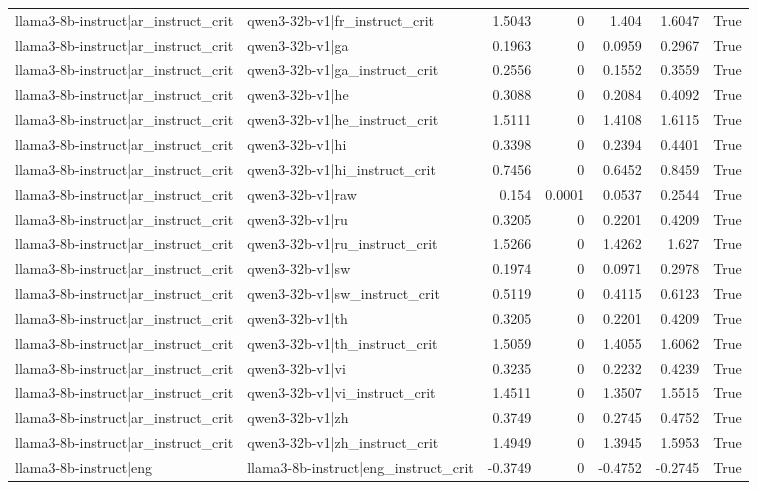 \begin{table}
\begin{tabular}{l l r r r r l}
llama3-8b-instruct|ar_instruct_crit & qwen3-32b-v1|fr_instruct_crit & 1.5043 & 0 & 1.404 & 1.6047 & True \\
llama3-8b-instruct|ar_instruct_crit & qwen3-32b-v1|ga & 0.1963 & 0 & 0.0959 & 0.2967 & True \\
llama3-8b-instruct|ar_instruct_crit & qwen3-32b-v1|ga_instruct_crit & 0.2556 & 0 & 0.1552 & 0.3559 & True \\
llama3-8b-instruct|ar_instruct_crit & qwen3-32b-v1|he & 0.3088 & 0 & 0.2084 & 0.4092 & True \\
llama3-8b-instruct|ar_instruct_crit & qwen3-32b-v1|he_instruct_crit & 1.5111 & 0 & 1.4108 & 1.6115 & True \\
llama3-8b-instruct|ar_instruct_crit & qwen3-32b-v1|hi & 0.3398 & 0 & 0.2394 & 0.4401 & True \\
llama3-8b-instruct|ar_instruct_crit & qwen3-32b-v1|hi_instruct_crit & 0.7456 & 0 & 0.6452 & 0.8459 & True \\
llama3-8b-instruct|ar_instruct_crit & qwen3-32b-v1|raw & 0.154 & 0.0001 & 0.0537 & 0.2544 & True \\
llama3-8b-instruct|ar_instruct_crit & qwen3-32b-v1|ru & 0.3205 & 0 & 0.2201 & 0.4209 & True \\
llama3-8b-instruct|ar_instruct_crit & qwen3-32b-v1|ru_instruct_crit & 1.5266 & 0 & 1.4262 & 1.627 & True \\
llama3-8b-instruct|ar_instruct_crit & qwen3-32b-v1|sw & 0.1974 & 0 & 0.0971 & 0.2978 & True \\
llama3-8b-instruct|ar_instruct_crit & qwen3-32b-v1|sw_instruct_crit & 0.5119 & 0 & 0.4115 & 0.6123 & True \\
llama3-8b-instruct|ar_instruct_crit & qwen3-32b-v1|th & 0.3205 & 0 & 0.2201 & 0.4209 & True \\
llama3-8b-instruct|ar_instruct_crit & qwen3-32b-v1|th_instruct_crit & 1.5059 & 0 & 1.4055 & 1.6062 & True \\
llama3-8b-instruct|ar_instruct_crit & qwen3-32b-v1|vi & 0.3235 & 0 & 0.2232 & 0.4239 & True \\
llama3-8b-instruct|ar_instruct_crit & qwen3-32b-v1|vi_instruct_crit & 1.4511 & 0 & 1.3507 & 1.5515 & True \\
llama3-8b-instruct|ar_instruct_crit & qwen3-32b-v1|zh & 0.3749 & 0 & 0.2745 & 0.4752 & True \\
llama3-8b-instruct|ar_instruct_crit & qwen3-32b-v1|zh_instruct_crit & 1.4949 & 0 & 1.3945 & 1.5953 & True \\
llama3-8b-instruct|eng & llama3-8b-instruct|eng_instruct_crit & -0.3749 & 0 & -0.4752 & -0.2745 & True \\

\end{tabular}
\end{table}
